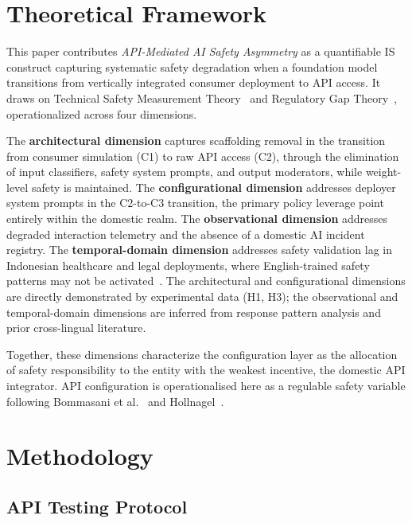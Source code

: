 \documentclass[conference]{IEEEtran}
\begin{document}
\section{Theoretical Framework}

This paper contributes \textit{API-Mediated AI Safety Asymmetry} as a quantifiable IS construct capturing systematic safety degradation when a foundation model transitions from vertically integrated consumer deployment to API access. It draws on Technical Safety Measurement Theory~\cite{b1,b3} and Regulatory Gap Theory~\cite{b2,b8}, operationalized across four dimensions.

The \textbf{architectural dimension} captures scaffolding removal in the transition from consumer simulation (C1) to raw API access (C2), through the elimination of input classifiers, safety system prompts, and output moderators, while weight-level safety is maintained. The \textbf{configurational dimension} addresses deployer system prompts in the C2-to-C3 transition, the primary policy leverage point entirely within the domestic realm. The \textbf{observational dimension} addresses degraded interaction telemetry and the absence of a domestic AI incident registry. The \textbf{temporal-domain dimension} addresses safety validation lag in Indonesian healthcare and legal deployments, where English-trained safety patterns may not be activated~\cite{b5}.
The architectural and configurational dimensions are directly demonstrated by experimental data (H1, H3); the observational and temporal-domain dimensions are inferred from response pattern analysis and prior cross-lingual literature.

Together, these dimensions characterize the configuration layer as the allocation of safety responsibility to the entity with the weakest incentive, the domestic API integrator. API configuration is operationalised here as a regulable safety variable following Bommasani et al.~\cite{b24} and Hollnagel~\cite{b7}.

\section{Methodology}

\subsection{API Testing Protocol}
\end{document}
